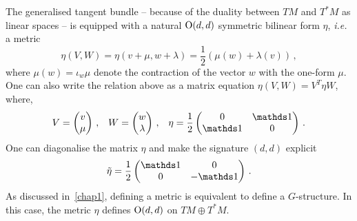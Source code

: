 \documentclass[debug]{phd}
\begin{document}
					The generalised tangent bundle -- because of the duality between $TM$ and $T^*M$ as linear spaces -- is equipped with a natural $\mathrm{O}(d,d)$ symmetric bilinear form $\eta$, \emph{i.e.} a metric
							\begin{equation}
								\eta(V , W) = \eta(v+\mu , w + \lambda ) = \frac{1}{2} \left( \mu(w) + \lambda(v) \right) \, ,
							\end{equation}
					where $\mu(w) = \iota_w \mu$ denote the contraction of the vector $w$ with the one-form $\mu$. 
					One can also write the relation above as a matrix equation $\eta(V , W) = V^T \eta W$, where,
							\begin{align}
								V = \begin{pmatrix}
								 v \\
								 \mu
								\end{pmatrix}\, , & & W = \begin{pmatrix}
								 w \\
								 \lambda
								\end{pmatrix}\, , & & \eta = \frac{1}{2} \begin{pmatrix}
									0 & \id \\
									\id & 0 
								\end{pmatrix}\, .
							\end{align}
					One can diagonalise the matrix $\eta$ and make the signature $(d,d)$ explicit
							\begin{equation}
								\tilde{\eta} = \frac{1}{2} \begin{pmatrix}
									\id & 0\\
									0 & -\id 
								\end{pmatrix}\, .
							\end{equation}
					As discussed in~\cref{chap1}, defining a metric is equivalent to define a $G$-structure.
					In this case, the metric $\eta$ defines $\mathrm{O}(d,d)$ on $TM \oplus T^*M$. 
					
					
\end{document}
